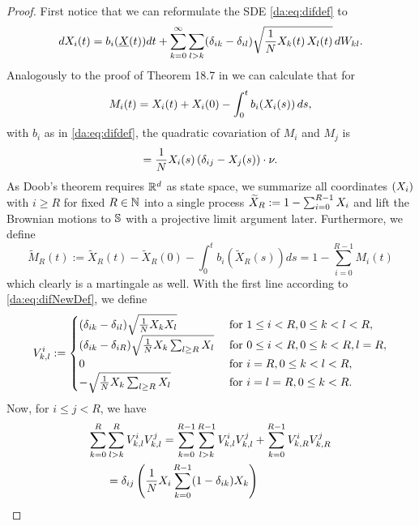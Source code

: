 \begin{proof}
\noindent First notice that we can reformulate the SDE \eqref{da:eq:difdef} to
\begin{align} \label{da:eq:difNewDef} 
d X_{i} \! \left( t \right) = 
	b_i(\underline{X} \! \left( t \right)) dt 
  + \sum_{k=0}^\infty \sum_{l > k}  (\delta_{ik} - \delta_{il}) \sqrt{\frac{1}{N} X_{k} \! \left( t \right)
  X_{l} \! \left( t \right) } \, dW_{kl}.
\end{align}
Analogously to the proof of Theorem 18.7 in \cite{kallenberg_foundations_1997}
we can calculate that for
\begin{align} \label{da:eq:defMi}
M_i(t) = X_{i} \! \left( t \right) + X_{i} \! \left( 0 \right) - \int_0^t b_i(X_{i} \! \left( s \right)) \, ds,
\end{align}
with $b_i$ as in \eqref{da:eq:difdef}, the quadratic covariation of $M_i$ and $M_j$ is
\begin{align*}
[M_i,M_j] = \frac{1}{N} \mrDifKT{i}{s} (\delta_{ij} - \mrDifKT{j}{s}) \cdot \nu.
\end{align*}
As Doob's theorem requires $\mathbb{R}^d$ as state space, we summarize all coordinates
$(X_{i})$ with $i \geq R$ for fixed $R \in \mathbb{N}$ into a single process $\widetilde{X}_R :=
1-\sum_{i=0}^{R-1} X_{i}$ and lift the Brownian motions to $\mathbb{S}$ with a projective limit
argument later. Furthermore, we define 
$$ \widetilde{M}_R(t) 
:=  \widetilde{X}_R(t) - \widetilde{X}_R(0) - \int_0^t b_i\left(
\widetilde{X}_R(s) \right) ds = 1-\sum_{i=0}^{R-1} M_i(t) $$
which clearly is a martingale as well. With the first line according to \eqref{da:eq:difNewDef}, we
define $$ V_{k,l}^i := \begin{cases}
(\delta_{ik} - \delta_{il}) \sqrt{\frac{1}{N} X_{k} X_{l}} 
	& \text{ for } 1 \leq i < R, 0 \leq k < l < R, \\
(\delta_{ik} - \delta_{iR}) \sqrt{\frac{1}{N} X_{k} \sum_{l \geq R} X_{l}} 
	& \text{ for } 0 \leq i < R, 0 \leq k < R, l = R, \\
0   & \text{ for } i = R, 0 \leq k < l < R, \\  
- \sqrt{\frac{1}{N} X_{k} \sum_{l \geq R} X_{l}} 
	& \text{ for } i = l = R, 0 \leq k < R. \\	
\end{cases}$$
Now, for $i \leq j < R$, we have
\begin{align*}
\sum_{k=0}^R & \sum_{l>k}^R V_{k,l}^i V_{k,l}^j
= \sum_{k=0}^{R-1} \sum_{l>k}^{R-1} V_{k,l}^i V_{k,l}^j + \sum_{k=0}^{R-1} V_{k,R}^i V_{k,R}^j \\
&= \delta_{ij} \left( \frac{1}{N} \mrDifK{i} \sum_{k=0}^{R-1} (1-\delta_{ik}) \mrDifK{k} \right)

\end{align*}
\end{proof}
